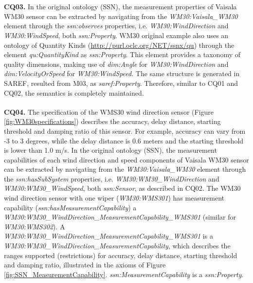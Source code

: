 \documentclass{sig-alternate-05-2015}
\begin{document}
\\\\\textbf{CQ03.} In the original ontology (SSN), the measurement properties of Vaisala WM30 sensor can be extracted by navigating from the \textit{WM30:Vaisala\_WM30} element through the \textit{ssn:observes} properties, i.e. \textit{WM30:WindDirection} and \textit{WM30:WindSpeed}, both \textit{ssn:Property}. WM30 original example also uses an ontology of Quantity Kinds (\url{http://purl.oclc.org/NET/ssnx/qu}) through the element \textit{qu:QuantityKind} as \textit{ssn:Property}. This element provides a taxonomy of quality dimensions, making use of \textit{dim:Angle} for \textit{WM30:WindDirection} and \textit{dim:VelocityOrSpeed} for \textit{WM30:WindSpeed}. The same structure is generated in SAREF, resulted from M03, as \textit{saref:Property}. Therefore, similar to CQ01 and CQ02, the semantics is completely maintained.
\\\\\textbf{CQ04.} The specification of the WMS30 wind direction sensor (Figure \ref{fig:WM30specifications}) describes the accuracy, delay distance, starting threshold and damping ratio of this sensor. For example, accuracy can vary from -3 to 3 degrees, while the delay distance is 0.6 meters and the starting threshold is lower than 1.0 m/s.  
In the original ontology (SSN), the measurement capabilities of each wind direction and speed components  of Vaisala WM30 sensor can be extracted by navigating from the \textit{WM30:Vaisala\_WM30} element through the \textit{ssn:hasSubSystem} properties, i.e. \textit{WM30:WM30\_WindDirection} and \textit{WM30:WM30\_WindSpeed}, both \textit{ssn:Sensor}, as described in CQ02. The WM30 wind direction sensor with one wiper (\textit{WM30:WMS301}) has measurement capability (\textit{ssn:hasMeasurementCapability}) a  \textit{WM30:WM30\_WindDirection\_MeasurementCapability\_WMS301} (similar for \textit{WM30:WMS302}). A \textit{WM30:WM30\_WindDirection\_MeasurementCapability\_WMS301} is a \textit{WM30:WM30\_WindDirection\_MeasurementCapability}, which describes the ranges supported (restrictions) for accuracy, delay distance, starting threshold and damping ratio, illustrated in the axioms of Figure \ref{fig:SSN_MeasurementCapability}. \textit{ssn:MeasurementCapability} is a \textit{ssn:Property}. 
\end{document}
